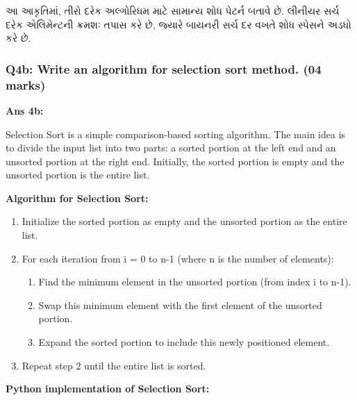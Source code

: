 આ આકૃતિમાં, તીરો દરેક અલ્ગોરિધમ માટે સામાન્ય શોધ પેટર્ન બતાવે છે. લીનીયર સર્ચ દરેક
એલિમેન્ટની ક્રમશઃ તપાસ કરે છે, જ્યારે બાયનરી સર્ચ દર વખતે શોધ સ્પેસને અડધો કરે છે.

\hypertarget{q4b-write-an-algorithm-for-selection-sort-method.-04-marks}{%
\subsubsection{Q4b: Write an algorithm for selection sort method. (04
marks)}\label{q4b-write-an-algorithm-for-selection-sort-method.-04-marks}}

\textbf{Ans 4b:}

Selection Sort is a simple comparison-based sorting algorithm. The main
idea is to divide the input list into two parts: a sorted portion at the
left end and an unsorted portion at the right end. Initially, the sorted
portion is empty and the unsorted portion is the entire list.

\textbf{Algorithm for Selection Sort:}

\begin{enumerate}
\def\labelenumi{\arabic{enumi}.}
\tightlist
\item
  Initialize the sorted portion as empty and the unsorted portion as the
  entire list.
\item
  For each iteration from i = 0 to n-1 (where n is the number of
  elements):

  \begin{enumerate}
  \def\labelenumii{\alph{enumii}.}
  \tightlist
  \item
    Find the minimum element in the unsorted portion (from index i to
    n-1).
  \item
    Swap this minimum element with the first element of the unsorted
    portion.
  \item
    Expand the sorted portion to include this newly positioned element.
  \end{enumerate}
\item
  Repeat step 2 until the entire list is sorted.
\end{enumerate}

\textbf{Python implementation of Selection Sort:}


